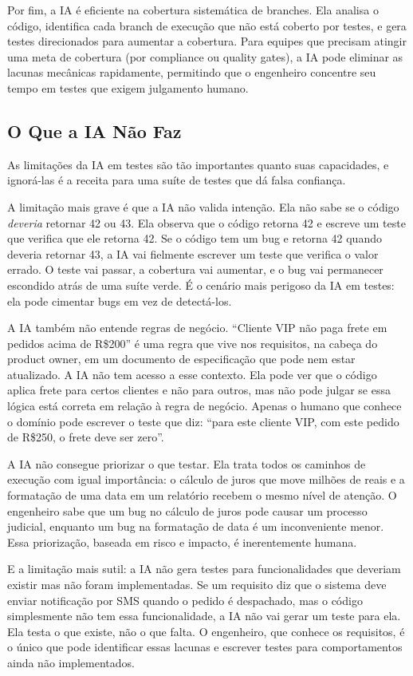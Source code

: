 Por fim, a IA é eficiente na cobertura sistemática de branches. Ela analisa o
código, identifica cada branch de execução que não está coberto por testes, e
gera testes direcionados para aumentar a cobertura. Para equipes que precisam
atingir uma meta de cobertura (por compliance ou quality gates), a IA pode
eliminar as lacunas mecânicas rapidamente, permitindo que o engenheiro concentre
seu tempo em testes que exigem julgamento humano.

\subsection{O Que a IA Não Faz}

As limitações da IA em testes são tão importantes quanto suas capacidades, e
ignorá-las é a receita para uma suíte de testes que dá falsa confiança.

A limitação mais grave é que a IA não valida intenção. Ela não sabe se o
código \textit{deveria} retornar 42 ou 43. Ela observa que o código retorna 42
e escreve um teste que verifica que ele retorna 42. Se o código tem um bug e
retorna 42 quando deveria retornar 43, a IA vai fielmente escrever um teste que
verifica o valor errado. O teste vai passar, a cobertura vai aumentar, e o bug
vai permanecer escondido atrás de uma suíte verde. É o cenário mais perigoso da
IA em testes: ela pode cimentar bugs em vez de detectá-los.

A IA também não entende regras de negócio. ``Cliente VIP não paga frete em
pedidos acima de R\$200'' é uma regra que vive nos requisitos, na cabeça do
product owner, em um documento de especificação que pode nem estar atualizado.
A IA não tem acesso a esse contexto. Ela pode ver que o código aplica frete para
certos clientes e não para outros, mas não pode julgar se essa lógica está
correta em relação à regra de negócio. Apenas o humano que conhece o domínio
pode escrever o teste que diz: ``para este cliente VIP, com este pedido de
R\$250, o frete deve ser zero''.

A IA não consegue priorizar o que testar. Ela trata todos os caminhos de
execução com igual importância: o cálculo de juros que move milhões de reais e
a formatação de uma data em um relatório recebem o mesmo nível de atenção. O
engenheiro sabe que um bug no cálculo de juros pode causar um processo judicial,
enquanto um bug na formatação de data é um inconveniente menor. Essa
priorização, baseada em risco e impacto, é inerentemente humana.

E a limitação mais sutil: a IA não gera testes para funcionalidades que
deveriam existir mas não foram implementadas. Se um requisito diz que o sistema
deve enviar notificação por SMS quando o pedido é despachado, mas o código
simplesmente não tem essa funcionalidade, a IA não vai gerar um teste para ela.
Ela testa o que existe, não o que falta. O engenheiro, que conhece os
requisitos, é o único que pode identificar essas lacunas e escrever testes para
comportamentos ainda não implementados.

